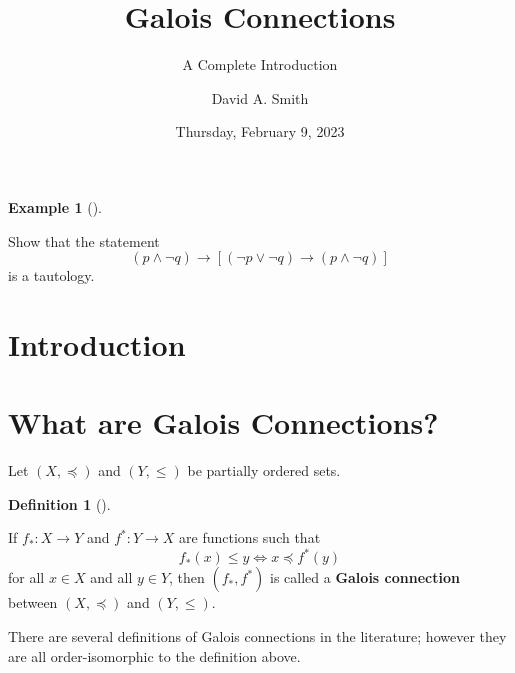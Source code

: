 \documentclass[
  twoside,
  12pt,
  letterpaper,
  fleqn]{article}
\title{Galois Connections}
\subtitle{A Complete Introduction}
\author{David A. Smith}
\date{Thursday, February 9, 2023}
\renewcommand*\contentsname{Table of contents}
\newcommand\contentsname{Table of contents}
\theoremstyle{plain}
\theoremstyle{definition}
\newtheorem{example}{Example}[section]
\theoremstyle{definition}
\newtheorem{definition}{Definition}[section]
\theoremstyle{remark}
\begin{document}
\maketitle
\ifdefined\Shaded\renewenvironment{Shaded}{\begin{tcolorbox}[enhanced, sharp corners, frame hidden, borderline west={3pt}{0pt}{shadecolor}, interior hidden, boxrule=0pt, breakable]}{\end{tcolorbox}}\fi

\renewcommand*\contentsname{Table of contents}
{
\setcounter{tocdepth}{3}
\tableofcontents
}
\begin{example}[]\protect\hypertarget{exm-tautology-2}{}\label{exm-tautology-2}

Show that the statement \begin{equation}
\label{scsex}
(p\land \neg q)\rightarrow [(\neg p\lor \neg q)\rightarrow (p\land \neg q)]
\end{equation} is a tautology.

\end{example}

\hypertarget{introduction}{%
\section{Introduction}\label{introduction}}

\hypertarget{what-are-galois-connections}{%
\section{What are Galois
Connections?}\label{what-are-galois-connections}}

Let \((X,\preceq)\) and \((Y,\leqslant)\) be partially ordered sets.

\begin{definition}[]\protect\hypertarget{def-galois-connection}{}\label{def-galois-connection}

If \(f_*:X\to Y\) and \(f^*:Y\to X\) are functions such that
\begin{equation}
\label{gc}
f_*(x)\leqslant y \Longleftrightarrow x\preceq f^*(y)
\end{equation} for all \(x\in X\) and all \(y\in Y\), then
\((f_*, f^*)\) is called a \textbf{Galois connection} between
\((X,\preceq)\) and \((Y,\leqslant)\).

\end{definition}

There are several definitions of Galois connections in the literature;
however they are all order-isomorphic to the definition above.
\end{document}
